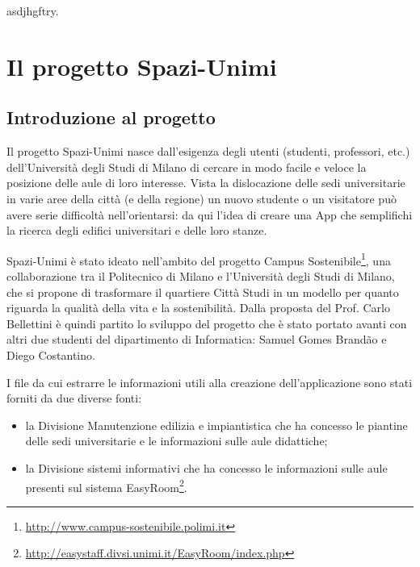 \documentclass[12pt]{report}
\begin{document}
%
%
asdjhgftry.
\afterpreface
% 
% 
\chapter{Il progetto Spazi-Unimi}
\label{cap1}

\section{Introduzione al progetto}

Il progetto Spazi-Unimi nasce dall’esigenza degli utenti (studenti, professori, etc.) dell’Università degli Studi di Milano di cercare in modo facile e veloce la posizione delle aule di loro interesse. 
Vista la dislocazione delle sedi universitarie in varie aree della città (e della regione) un nuovo studente o un visitatore può avere serie difficoltà nell’orientarsi: da qui l’idea di creare una App che semplifichi la ricerca degli edifici universitari e delle loro stanze. 

Spazi-Unimi è stato ideato nell’ambito del progetto Campus Sostenibile\footnote{\url{http://www.campus-sostenibile.polimi.it}}, una collaborazione tra il Politecnico di Milano e l’Università degli Studi di Milano, che si propone di trasformare il quartiere Città Studi in un modello per quanto riguarda la qualità della vita e la sostenibilità.
Dalla proposta del Prof. Carlo Bellettini è quindi partito lo sviluppo del progetto che è stato portato avanti con altri due studenti del dipartimento di Informatica: Samuel Gomes Brandão e Diego Costantino.

\vspace{5mm} %

I file da cui estrarre le informazioni utili alla creazione dell'applicazione sono stati forniti da due diverse fonti:
\begin{itemize}
\item la Divisione Manutenzione edilizia e impiantistica che ha concesso le piantine delle sedi universitarie e le informazioni sulle aule didattiche;
\item la Divisione sistemi informativi che ha concesso le informazioni sulle aule presenti sul sistema EasyRoom\footnote{\url{http://easystaff.divsi.unimi.it/EasyRoom/index.php}}.
\end{itemize}

\vspace{5mm} %
\end{document}
